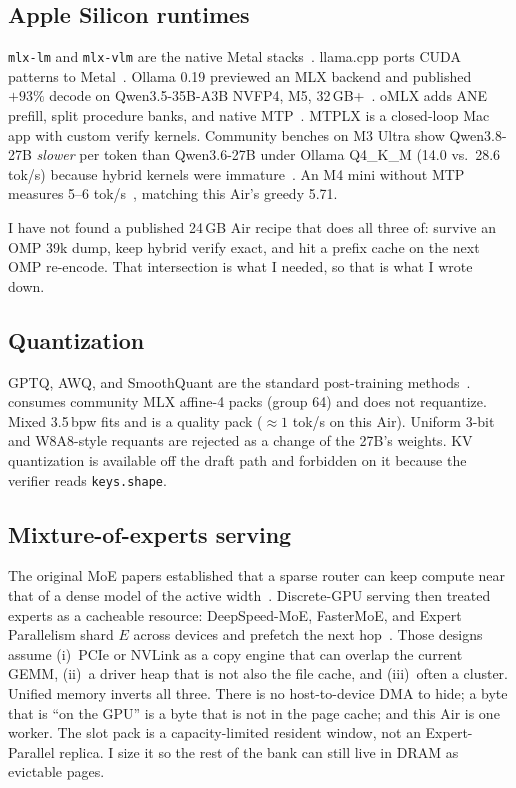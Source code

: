 \subsection{Apple Silicon runtimes}

\texttt{mlx-lm} and \texttt{mlx-vlm} are the native Metal stacks~\citep{mlx2023,mlxlm,mlxvlm}. llama.cpp ports CUDA patterns to Metal~\citep{llamacpp}. Ollama 0.19 previewed an MLX backend and published ${+}93\%$ decode on Qwen3.5-35B-A3B NVFP4, M5, 32\,GB+~\citep{ollama019}. oMLX adds ANE prefill, split procedure banks, and native MTP~\citep{omlx2874,omlx2781,weschera2026}. MTPLX is a closed-loop Mac app with custom verify kernels. Community benches on M3 Ultra show Qwen3.8-27B \emph{slower} per token than Qwen3.6-27B under Ollama Q4\_K\_M (14.0 vs.\ 28.6 tok/s) because hybrid kernels were immature~\citep{terminalbytes2026}. An M4 mini without MTP measures 5--6 tok/s~\citep{orcarouter2026}, matching this Air's greedy 5.71.

I have not found a published 24\,GB Air recipe that does all three of: survive an OMP 39k dump, keep hybrid verify exact, and hit a prefix cache on the next OMP re-encode. That intersection is what I needed, so that is what I wrote down.

\subsection{Quantization}

GPTQ, AWQ, and SmoothQuant are the standard post-training methods~\citep{frantar2023gptq,lin2024awq,xiao2024smoothquant}. \slotbank{} consumes community MLX affine-4 packs (group 64) and does not requantize. Mixed 3.5\,bpw fits and is a quality pack ($\approx 1$ tok/s on this Air). Uniform 3-bit and W8A8-style requants are rejected as a change of the 27B's weights. KV quantization is available off the draft path and forbidden on it because the verifier reads \texttt{keys.shape}.

\subsection{Mixture-of-experts serving}

The original MoE papers established that a sparse router can keep compute near that of a dense model of the active width~\citep{shazeer2017moe,fedus2022switch,mixtral2024}. Discrete-GPU serving then treated experts as a cacheable resource: DeepSpeed-MoE, FasterMoE, and Expert Parallelism shard $E$ across devices and prefetch the next hop~\citep{rajbhandari2022deepspeed,he2022fastermoe}. Those designs assume (i)~PCIe or NVLink as a copy engine that can overlap the current GEMM, (ii)~a driver heap that is not also the file cache, and (iii)~often a cluster. Unified memory inverts all three. There is no host-to-device DMA to hide; a byte that is ``on the GPU'' is a byte that is not in the page cache; and this Air is one worker. The slot pack is a capacity-limited resident window, not an Expert-Parallel replica. I size it so the rest of the bank can still live in DRAM as evictable pages.


